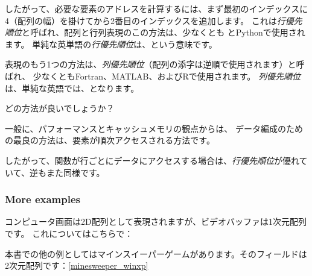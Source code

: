 
したがって、必要な要素のアドレスを計算するには、まず最初のインデックスに
4（配列の幅）を掛けてから2番目のインデックスを追加します。
これは\emph{行優先順位}と呼ばれ、配列と行列表現のこの方法は、少なくとも \CCpp とPythonで使用されます。
単純な英単語の\emph{行優先順位}は、という意味です。

表現のもう1つの方法は、\emph{列優先順位}（配列の添字は逆順で使用されます）と呼ばれ、
少なくともFortran、MATLAB、およびRで使用されます。
\emph{列優先順位}は、単純な英語では、となります。

どの方法が良いでしょうか？

一般に、パフォーマンスとキャッシュメモリの観点からは、
データ編成のための最良の方法は、要素が順次アクセスされる方法です。

したがって、関数が行ごとにデータにアクセスする場合は、\emph{行優先順位}が優れていて、逆もまた同様です。




%

\subsubsection{More examples}

コンピュータ画面は2D配列として表現されますが、ビデオバッファは1次元配列です。
これについてはこちらで：

本書での他の例としてはマインスイーパーゲームがあります。そのフィールドは2次元配列です：\ref{minesweeper_winxp}
